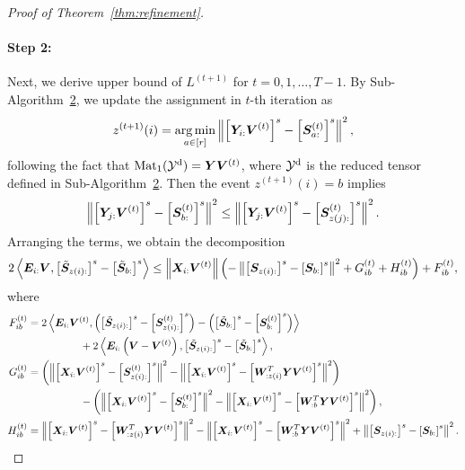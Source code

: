 \documentclass[lettersize,journal]{IEEEtran}
\theoremstyle{definition}
\theoremstyle{definition}
\newcommand{\of}[1]{\left(#1\right)}
\newcommand{\off}[1]{\left[#1\right]}
\newcommand{\ang}[1]{\left\langle#1\right\rangle}
\begin{document}
\begin{proof}[Proof of Theorem~\ref{thm:refinement}]
\paragraph{Step 2:} Next, we derive upper bound of $L^{(t+1)}$ for $t = 0 ,1, \ldots, T-1$. By Sub-Algorithm~\hyperref[alg:main]{2}, we update the assignment in $t$-th iteration as 
    \begin{equation}
        z^{(t+1)}(i) = \argmin_{a \in [r]} \onorm{ \off{ \mY_{i:} \mV^{(t)}  }^s - \off{\mS_{a:}^{(t)}}^s }^2,
    \end{equation}
    following the fact that $\text{Mat}_1(\mathcal{Y}^\text{d}) = \bm Y \bm{V}^{(t)}$, where $\mathcal{Y}^\text{d}$ is the reduced tensor defined in Sub-Algorithm~\hyperref[alg:main]{2}. Then the event $z^{(t+1)}(i) = b$ implies
    \begin{equation}
        \onorm{ \off{ \mY_{j:} \mV^{(t)}  }^s - \off{\mS_{b:}^{(t)}}^s }^2 \leq \onorm{ \off{ \mY_{j:} \mV^{(t)}  }^s - \off{\mS_{z(j):}^{(t)}}^s }^2.
    \end{equation}
    Arranging the terms, we obtain the decomposition
    \begin{equation}\label{eq:decomp}
        2 \ang{ \mE_{i:} \mV, \off{  \tilde \mS_{z(i):} }^s - \off{  \tilde \mS_{b:} }^s } \leq \onorm{\mX_{i:} \mV^{(t)}} \of{ - \onorm{ \off{ \mS_{z(i):}  }^s - \off{ \mS_{b:}  }^s  }^2 + G_{ib}^{(t)} + H_{ib}^{(t)} } +  F_{ib}^{(t)},
    \end{equation}
    where
    \begin{align}
        F_{ib}^{(t)} &= 2 \ang{\mE_{i:} \mV^{(t)}, \of{ \off{  \tilde \mS_{z(i):} }^s  -  \off{  \mS_{z(i):}^{(t)} }^s  }  - \of{  \off{  \tilde \mS_{b:} }^s  -  \off{  \mS_{b:}^{(t)} }^s  }  } \\
        & \quad \quad \quad \quad \quad + 2 \ang{ \mE_{i:} \of{ \mV - \mV^{(t)} }, \off{  \tilde \mS_{z(i):} }^s - \off{  \tilde \mS_{b:} }^s  },\\
        G_{ib}^{(t)} &=   \of{ \onorm{ \off{\mX_{i:} \mV^{(t)}}^s -  \off{  \mS_{z(i):}^{(t)}  }^s}^2 -  \onorm{ \off{\mX_{i:} \mV^{(t)}}^s -  \off{  \mW_{:z(i)}^T \mY \mV^{(t)} }^s}^2}   \\
        & \quad \quad \quad \quad \quad -   \of{ \onorm{ \off{\mX_{i:} \mV^{(t)}}^s -  \off{  \mS_{b:}^{(t)}  }^s}^2 -  \onorm{ \off{\mX_{i:} \mV^{(t)}}^s -  \off{  \mW_{:b}^T \mY \mV^{(t)} }^s}^2 }, \\
        H_{ib}^{(t)} &=   \onorm{ \off{\mX_{i:} \mV^{(t)}}^s -  \off{  \mW_{:z(i)}^T \mY \mV^{(t)} }^s}^2 - \onorm{ \off{\mX_{i:} \mV^{(t)}}^s -  \off{  \mW_{:b}^T \mY \mV^{(t)} }^s}^2  + \onorm{ \off{ \mS_{z(i):}  }^s - \off{ \mS_{b:}  }^s  }^2 .
    \end{align}
    

\end{proof}
\end{document}
